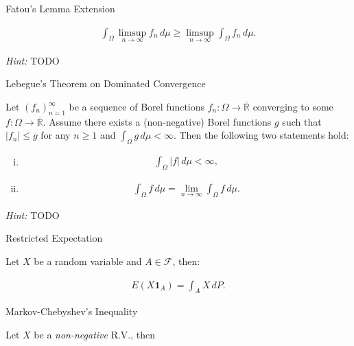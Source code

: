 \documentclass[10pt,landscape]{article}
\renewcommand{\leq}{\leqslant}
\renewcommand{\geq}{\geqslant}
\newcommand{\Hint}{\textit{Hint: }}
\newcommand{\Indicator}[1]{\mathbf{1}_{#1}}
\newcommand{\CalF}{\mathcal{F}}
\begin{document}
\begin{multicols}{3}
\begin{corollary}{3.11}{Fatou's Lemma Extension}
\begin{enumerate}[(i)]
            \begin{align*}
                \int_{\Omega} \limsup_{n \to \infty} f_n \, d\mu \geq \limsup_{n \to \infty} \int_{\Omega} f_n \, d\mu.
            \end{align*}
        \end{enumerate}

    \Hint TODO

\end{corollary}

\begin{theorem}{3.12}{Lebegue's Theorem on Dominated Convergence}

    Let $(f_n)_{n=1}^{\infty}$ be a sequence of Borel functions $f_n: \Omega \to \overline{\mathbb{R}}$ converging to some $f: \Omega \to \overline{\mathbb{R}}$. Assume there exists a (non-negative) Borel functions $g$ such that $|f_n| \leq g$ for any $n \geq 1$ and $\int_{\Omega} g \, d\mu < \infty$. Then the following two statements hold:

        \begin{enumerate}[(i)]
            \item
                \begin{align*}
                    \int_{\Omega} |f| \, d\mu < \infty,
                \end{align*}
            \item
                \begin{align*}
                    \int_{\Omega} f \, d\mu = \lim_{n \to \infty} \int_{\Omega} f \, d\mu.
                \end{align*}
        \end{enumerate}

    \Hint TODO

\end{theorem}

\begin{proposition}{}{Restricted Expectation}

    Let $X$ be a random variable and $A \in \CalF$, then:

        \begin{align*}
            E(X \Indicator{A}) = \int_A X \,dP.
        \end{align*}

\end{proposition}

\begin{proposition}{3.18}{Markov-Chebyshev's Inequality}

    Let $X$ be a \emph{non-negative} R.V., then


\end{proposition}
\end{multicols}
\end{document}
